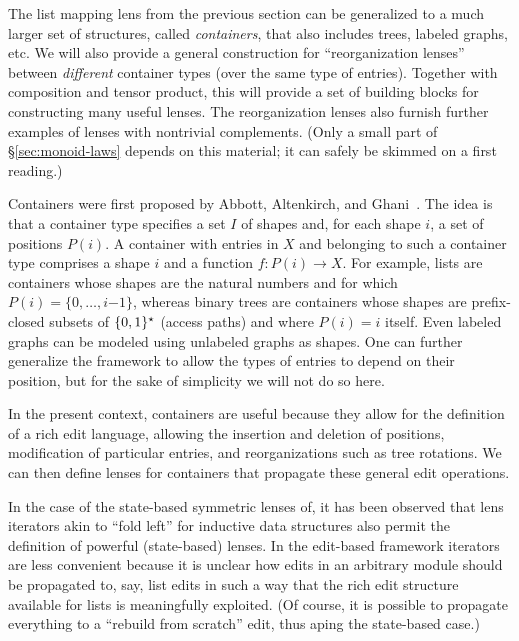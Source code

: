 \fi


\label{sec:containers}
The list mapping lens from the previous section can be generalized to a much
larger set of structures, called {\em containers}, that also includes trees,
labeled graphs, etc.  
%
We will also provide a general construction for ``reorganization lenses''
between {\em different} container types (over the same type of entries).
Together with composition and tensor product, this will provide a set of
building blocks for constructing many useful lenses. The reorganization
lenses also furnish further examples of lenses with nontrivial complements.
%
(Only a small part of \S \ref{sec:monoid-laws}
depends on this material; it can safely be skimmed on a first reading.)

Containers were first proposed by Abbott, Altenkirch, and
Ghani~\cite{1195941}.  The idea is that a container type
specifies a set $I$ of shapes and, for each shape $i$, a set of
positions $P(i)$. A container with entries in $X$ and  belonging to such a
container type comprises a shape $i$ and a function $f:P(i)\rightarrow
X$. For example, lists are containers whose shapes are the natural numbers and
for which $P(i)=\{0,\dots,i\mathord{-}1\}$, whereas binary trees are containers
whose shapes are prefix-closed subsets of $\{0,1\}^\star$ (access paths)
and where $P(i)=i$ itself. Even labeled graphs can be modeled using
unlabeled graphs as shapes.  One can further generalize the framework
to allow the types of entries to depend on their position, but for the
sake of simplicity we will not do so here.

In the present context, containers are useful because they allow for
the definition of a rich edit language, allowing the insertion and deletion
of positions, modification of particular entries, and 
reorganizations such as tree rotations. We can then define lenses for
containers that propagate these general edit operations.

In the case of the state-based symmetric lenses of\symmlenses, it
has been observed that lens iterators akin to ``fold left'' for inductive
data structures also permit the definition of powerful (state-based) lenses.
In the edit-based framework iterators are less convenient because it is
unclear how edits in an arbitrary module should be propagated to, say, list
edits in such a way that the rich edit structure available for lists is
meaningfully exploited. (Of course, it is possible to propagate everything to
a ``rebuild from scratch'' edit, thus aping the state-based case.)

